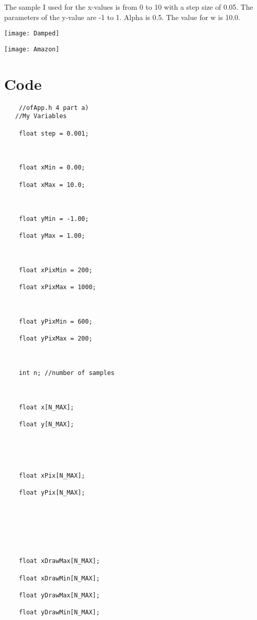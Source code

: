 \documentclass[letterpaper, 24pt, final, onecolumn, titlepage] {article}
\begin{document}
The sample I used for the x-values is from 0 to 10 with a step size of 0.05. The parameters of the y-value are -1 to 1. Alpha is 0.5. The value for w is 10.0.

\begin{center}\texttt{[image: Damped]} \end{center}

\begin{center}\texttt{[image: Amazon]} \end{center}
\pagebreak

\section{Code}
\singlespacing

\begin{lstlisting}
	//ofApp.h 4 part a)
   //My Variables

    float step = 0.001;



    float xMin = 0.00;

    float xMax = 10.0;



    float yMin = -1.00;

    float yMax = 1.00;



    float xPixMin = 200;

    float xPixMax = 1000;



    float yPixMin = 600;

    float yPixMax = 200;



    int n; //number of samples



    float x[N_MAX];

    float y[N_MAX];





    float xPix[N_MAX];

    float yPix[N_MAX];







    float xDrawMax[N_MAX];

    float xDrawMin[N_MAX];

    float yDrawMax[N_MAX];

    float yDrawMin[N_MAX];




\end{lstlisting}
\end{document}
